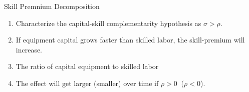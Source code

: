 \documentclass[notes,11pt, aspectratio=169]{beamer}
\newenvironment{wideitemize}{\itemize\addtolength{\itemsep}{10pt}}{\enditemize}
\begin{document}
\begin{frame}{Skill Premnium Decomposition}
\begin{wideitemize}
{\begin{enumerate}
        \begin{wideitemize}
          \item Characterize the capital-skill complementarity hypothesis as $\sigma > \rho$.
          \item If equipment capital grows faster than skilled labor, the skill-premium will increase.
        \end{wideitemize}
        \vspace{0.5cm}
        \item  The ratio of capital equipment to skilled labor 
        \vspace{0.5cm}
        \begin{wideitemize}
          \item  The effect will get larger (smaller) over time if $\rho > 0\:$ ($\rho < 0$). 
        \end{wideitemize}
      \end{enumerate}   
      }
\end{wideitemize}
\end{frame}
\end{document}

